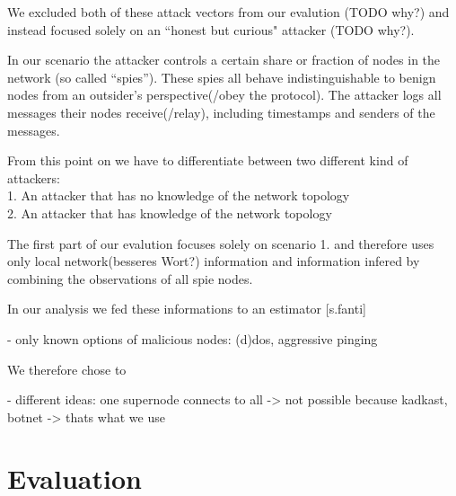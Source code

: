 We excluded both of these attack vectors from our evalution (TODO why?) and instead focused solely on an ``honest but curious" attacker (TODO why?).

In our scenario the attacker controls a certain share or fraction of nodes in the network (so called ``spies'').
These spies all behave indistinguishable to benign nodes from an outsider's perspective(/obey the protocol).
The attacker logs all messages their nodes receive(/relay), including timestamps and senders of the messages.

From this point on we have to differentiate between two different kind of attackers: \\
1. An attacker that has no knowledge of the network topology \\
2. An attacker that has knowledge of the network topology

The first part of our evalution focuses solely on scenario 1. and therefore uses only local
network(besseres Wort?) information and information infered by combining the observations of all spie nodes.


In our analysis we fed these informations to an estimator [s.fanti]

- only known options of malicious nodes: (d)dos, aggressive pinging

We therefore chose to 

- different ideas: one supernode connects to all -> not possible because kadkast, botnet -> thats what we use

\section{Evaluation}